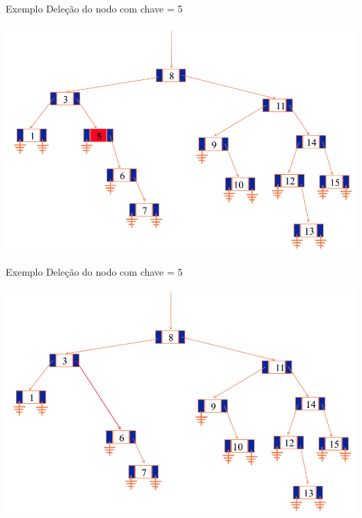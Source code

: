 \documentclass[12pt,table,xcolor={dvipsnames}]{beamer}
\begin{document}
\begin{frame}[fragile]{Exemplo}
Deleção do nodo com chave = 5
\begin{center}
\includegraphics[scale=.3]{arv10.png} 
\end{center}
\end{frame}

\begin{frame}[fragile]{Exemplo}
Deleção do nodo com chave = 5
\begin{center}
\includegraphics[scale=.3]{arv11.png} 
\end{center}
\end{frame}
\end{document}
